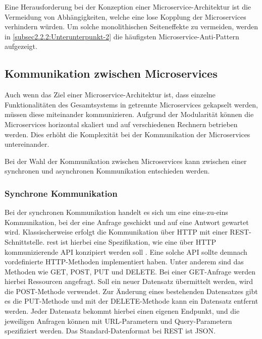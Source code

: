 Eine Herausforderung bei der Konzeption einer Microservice-Architektur ist die Vermeidung von Abhängigkeiten, welche eine lose Kopplung der Microservices verhindern würden. Um solche monolithischen Seiteneffekte zu vermeiden, werden in \autoref{subsec2.2.2:Unterunterpunkt-2} die häufigsten Microservice-Anti-Pattern aufgezeigt.

\subsection{Kommunikation zwischen Microservices\label{subsec2.3.1:Unterunterpunkt-1}}

Auch wenn das Ziel einer Microservice-Architektur ist, dass einzelne Funktionalitäten des Gesamtsystems in getrennte Microservices gekapselt werden, müssen diese miteinander kommunizieren. Aufgrund der Modularität können die Microservices horizontal skaliert und auf verschiedenen Rechnern betrieben werden. Dies erhöht die Komplexität bei der Kommunikation der Microservices untereinander. \cite{MichaelSchwab.2019}

Bei der Wahl der Kommunikation zwischen Microservices kann zwischen einer synchronen und asynchronen Kommunikation entschieden werden.

\subsubsection*{Synchrone Kommunikation}

Bei der synchronen Kommunikation handelt es sich um eine eins-zu-eins Kommunikation, bei der eine Anfrage geschickt und auf eine Antwort gewartet wird. Klassischerweise erfolgt die Kommunikation über HTTP mit einer REST-Schnittstelle. \gls{rest} ist hierbei eine Spezifikation, wie eine über HTTP kommunizierende API konzipiert werden soll \cite{MichaelSchwab.2019}. Eine solche API sollte demnach vordefinierte HTTP-Methoden implementiert haben. Unter anderem sind das Methoden wie GET, POST, PUT und DELETE. Bei einer GET-Anfrage werden hierbei Ressourcen angefragt. Soll ein neuer Datensatz übermittelt werden, wird die POST-Methode verwendet. Zur Änderung eines bestehenden Datensatzes gibt es die PUT-Methode und mit der DELETE-Methode kann ein Datensatz entfernt werden. Jeder Datensatz bekommt hierbei einen eigenen Endpunkt, und die jeweiligen Anfragen können mit URL-Parametern und Query-Parametern spezifiziert werden. Das Standard-Datenformat bei REST ist JSON.

